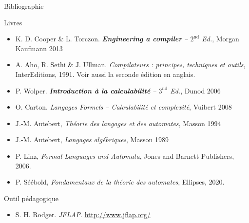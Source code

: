 
\begingroup

\begin{frame}{Bibliographie}
  \begin{block}{Livres}
    \footnotesize
    \begin{itemize}
    \item K. D. Cooper \& L. Torczon. \textit{\textbf{Engineering a compiler} -- $2^\text{nd}$ Ed.}, Morgan Kaufmann 2013
    \item A. Aho, R. Sethi \& J. Ullman. \textit{Compilateurs : principes, techniques et outils}, InterEditions, 1991. Voir aussi la seconde édition en anglais.
    \item P. Wolper. \textit{\textbf{Introduction à la calculabilité} -- $3^\text{nd}$ Ed.}, Dunod 2006
    \item O. Carton. \textit{Langages Formels -- Calculabilité et complexité}, Vuibert 2008
    \item J.-M. Autebert, \textit{Théorie des langages et des automates}, Masson 1994
    \item J.-M. Autebert, \textit{Langages algébriques}, Masson 1989
    \item P. Linz, \textit{Formal Languages and Automata}, Jones and Barnett Publishers, 2006.
    \item P. Séébold, \textit{Fondamentaux de la théorie des automates}, Ellipses, 2020.
    \end{itemize}
  \end{block}
  
  \begin{block}{Outil pédagogique}
    \footnotesize
    \begin{itemize}
    \item S. H. Rodger. \textit{JFLAP}. \url{http://www.jflap.org/} 
    \end{itemize}
  \end{block}
\end{frame}
\endgroup

